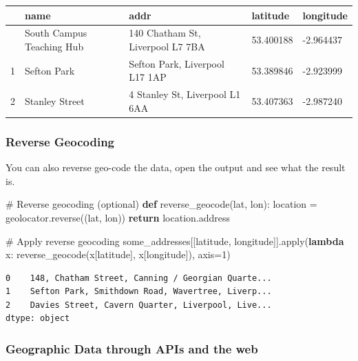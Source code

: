 \documentclass[
  letterpaper,
  DIV=11,
  numbers=noendperiod]{scrreprt}
\newenvironment{Shaded}{\begin{snugshade}}{\end{snugshade}}
\newcommand{\BuiltInTok}[1]{\textcolor[rgb]{0.00,0.23,0.31}{#1}}
\newcommand{\CommentTok}[1]{\textcolor[rgb]{0.37,0.37,0.37}{#1}}
\newcommand{\ControlFlowTok}[1]{\textcolor[rgb]{0.00,0.23,0.31}{\textbf{#1}}}
\newcommand{\DecValTok}[1]{\textcolor[rgb]{0.68,0.00,0.00}{#1}}
\newcommand{\KeywordTok}[1]{\textcolor[rgb]{0.00,0.23,0.31}{\textbf{#1}}}
\newcommand{\NormalTok}[1]{\textcolor[rgb]{0.00,0.23,0.31}{#1}}
\newcommand{\OperatorTok}[1]{\textcolor[rgb]{0.37,0.37,0.37}{#1}}
\newcommand{\StringTok}[1]{\textcolor[rgb]{0.13,0.47,0.30}{#1}}
\begin{document}
\begin{longtable}[]{@{}lllll@{}}
\toprule\noalign{}
& name & addr & latitude & longitude \\
\midrule\noalign{}
\endhead
\bottomrule\noalign{}
\endlastfoot
0 & South Campus Teaching Hub & 140 Chatham St, Liverpool L7 7BA &
53.400188 & -2.964437 \\
1 & Sefton Park & Sefton Park, Liverpool L17 1AP & 53.389846 &
-2.923999 \\
2 & Stanley Street & 4 Stanley St, Liverpool L1 6AA & 53.407363 &
-2.987240 \\
\end{longtable}

\subsubsection{Reverse Geocoding}\label{reverse-geocoding}

You can also reverse geo-code the data, open the output and see what the
result is.

\begin{Shaded}
\begin{Highlighting}[]
\CommentTok{\# Reverse geocoding (optional)}
\KeywordTok{def}\NormalTok{ reverse\_geocode(lat, lon):}
\NormalTok{    location }\OperatorTok{=}\NormalTok{ geolocator.reverse((lat, lon))}
    \ControlFlowTok{return}\NormalTok{ location.address}

\CommentTok{\# Apply reverse geocoding}
\NormalTok{some\_addresses[[}\StringTok{\textquotesingle{}latitude\textquotesingle{}}\NormalTok{, }\StringTok{\textquotesingle{}longitude\textquotesingle{}}\NormalTok{]].}\BuiltInTok{apply}\NormalTok{(}\KeywordTok{lambda}\NormalTok{ x: reverse\_geocode(x[}\StringTok{\textquotesingle{}latitude\textquotesingle{}}\NormalTok{], x[}\StringTok{\textquotesingle{}longitude\textquotesingle{}}\NormalTok{]), axis}\OperatorTok{=}\DecValTok{1}\NormalTok{)}
\end{Highlighting}
\end{Shaded}

\begin{verbatim}
0    148, Chatham Street, Canning / Georgian Quarte...
1    Sefton Park, Smithdown Road, Wavertree, Liverp...
2    Davies Street, Cavern Quarter, Liverpool, Live...
dtype: object
\end{verbatim}

\subsubsection{Geographic Data through APIs and the
web}\label{geographic-data-through-apis-and-the-web}
\end{document}

